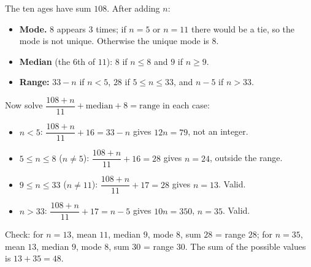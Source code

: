The ten ages have sum $108$. After adding $n$:
\begin{itemize}
\item \textbf{Mode.} $8$ appears $3$ times; if $n=5$ or $n=11$ there would be a tie, so the mode is not unique. Otherwise the unique mode is $8$.
\item \textbf{Median} (the $6$th of $11$): $8$ if $n\le8$ and $9$ if $n\ge9$.
\item \textbf{Range:} $33-n$ if $n<5$, $28$ if $5\le n\le33$, and $n-5$ if $n>33$.
\end{itemize}
Now solve $\dfrac{108+n}{11}+\text{median}+8=\text{range}$ in each case:
\begin{itemize}
\item $n<5$: $\dfrac{108+n}{11}+16=33-n$ gives $12n=79$, not an integer.
\item $5\le n\le8$ ($n\ne5$): $\dfrac{108+n}{11}+16=28$ gives $n=24$, outside the range.
\item $9\le n\le33$ ($n\ne11$): $\dfrac{108+n}{11}+17=28$ gives $n=13$. Valid.
\item $n>33$: $\dfrac{108+n}{11}+17=n-5$ gives $10n=350$, $n=35$. Valid.
\end{itemize}
Check: for $n=13$, mean $11$, median $9$, mode $8$, sum $28$ = range $28$; for $n=35$, mean $13$, median $9$, mode $8$, sum $30$ = range $30$. The sum of the possible values is $13+35=\boxed{48}$.
